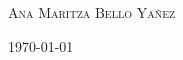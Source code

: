 \begin{center}
\vspace{0.5\baselineskip} %

{\scshape\Large Ana Maritza Bello Yañez\\} %

\vspace{0.5\baselineskip} %



\vfill %



\vspace{0.3\baselineskip} %

\today

\end{center}
